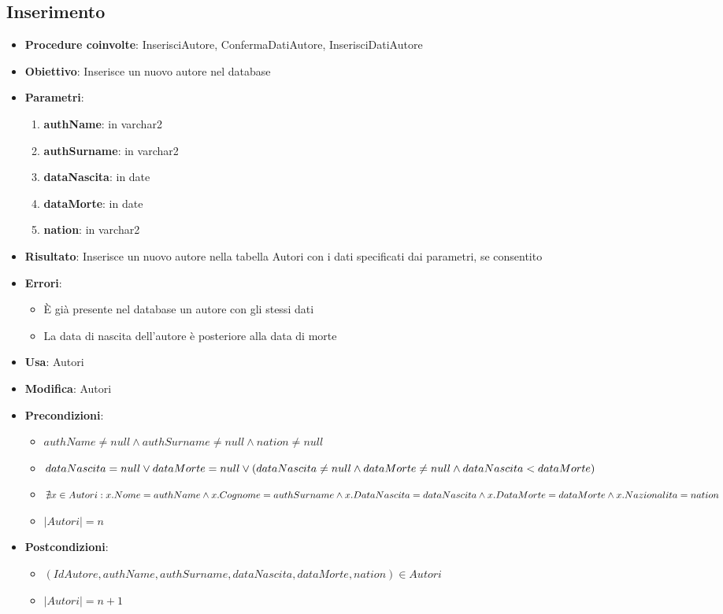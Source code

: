 \subsection{Inserimento}
\begin{itemize}
	\item \textbf{Procedure coinvolte}: InserisciAutore, ConfermaDatiAutore, InserisciDatiAutore
	\item \textbf{Obiettivo}: Inserisce un nuovo autore nel database
	\item \textbf{Parametri}:
	\begin{enumerate}
		\item \textbf{authName}: in varchar2
		\item \textbf{authSurname}: in varchar2
		\item \textbf{dataNascita}: in date
		\item \textbf{dataMorte}: in date
		\item \textbf{nation}: in varchar2
	\end{enumerate}
	\item \textbf{Risultato}: Inserisce un nuovo autore nella tabella Autori con i dati specificati dai parametri, se consentito
	\item \textbf{Errori}: 
	\begin{itemize}
		\item È già presente nel database un autore con gli stessi dati
		\item La data di nascita dell'autore è posteriore alla data di morte
	\end{itemize}
	\item \textbf{Usa}: Autori
	\item \textbf{Modifica}: Autori
	\item \textbf{Precondizioni}:
	\begin{itemize}
		\item $authName \ne null \land authSurname \ne null \land nation \ne null$
		\item $dataNascita = null \\
		\lor dataMorte = null \\ 
		\lor (dataNascita \ne null \land dataMorte \ne null \land dataNascita < dataMorte)$
		\item $\nexists x \in Autori : x.Nome = authName \land x.Cognome = authSurname \\
		\land x.DataNascita = dataNascita \land x.DataMorte = dataMorte \\
		\land x.Nazionalita = nation$
		\item $|Autori| = n$
	\end{itemize}
	\item \textbf{Postcondizioni}:
	\begin{itemize}
		\item $(IdAutore,authName,authSurname,dataNascita,dataMorte,nation) \in Autori$
		\item $|Autori| = n + 1$
	\end{itemize}
\end{itemize}

